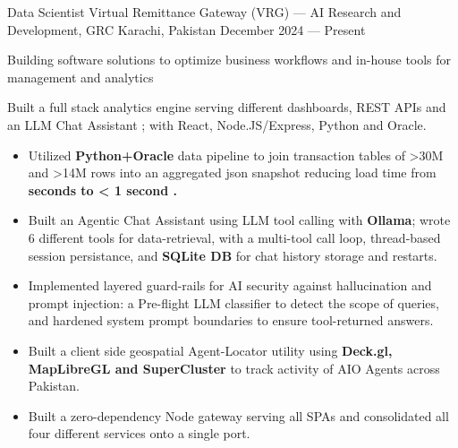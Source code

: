 


\newlength{\myspacing}
\setlength{\myspacing}{1em}

\begin{cventries}


\cventry
{Data Scientist} %
  {Virtual Remittance Gateway (VRG) --- AI Research and Development, GRC} %
{Karachi, Pakistan} %
{December 2024 --- Present} %
{%
  \begin{cvitems}
    \item {Building software solutions to optimize business workflows and in-house tools for management and analytics}
    \item {Built a full stack analytics engine serving different dashboards, REST APIs and an LLM Chat Assistant ; with React, Node.JS/Express, Python and Oracle.} \begin{itemize}
      \item {Utilized \textbf{Python+Oracle} data pipeline to join transaction tables of >30M and >14M rows into an aggregated json snapshot reducing load time from \textbf{ seconds to < 1 second .}}
      \item {Built an Agentic Chat Assistant using LLM tool calling with \textbf{Ollama}; wrote 6 different tools for data-retrieval, with a multi-tool call loop, thread-based session persistance, and \textbf{SQLite DB} for chat history storage and restarts.}
      \item {Implemented layered guard-rails for AI security against hallucination and prompt injection: a Pre-flight LLM classifier to detect the scope of queries, and hardened system prompt boundaries to ensure tool-returned answers.}
      \item {Built a client side geospatial Agent-Locator utility using \textbf{Deck.gl, MapLibreGL and SuperCluster} to track activity of AIO Agents across Pakistan.}
      \item {Built a zero-dependency Node gateway serving all SPAs and consolidated all four different services onto a single port.}

\end{itemize}
\end{cvitems}}
\end{cventries}
